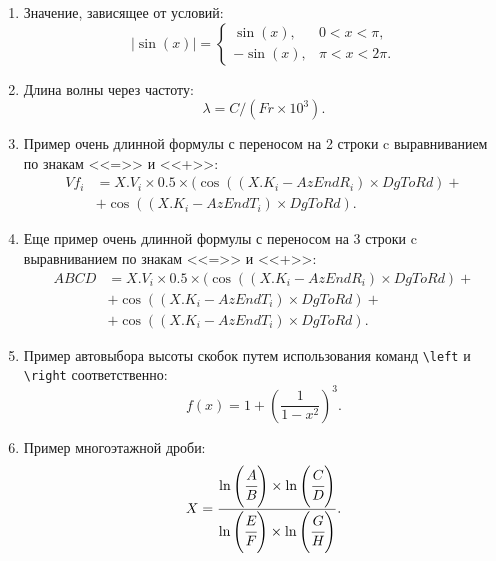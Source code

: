 \begin{enumerate}
\item Значение, зависящее от условий:
{%
	\begin{equation}	
	|\sin(x)|=
	\begin{cases}
	\sin(x), & 0<x<\pi, \\
	-\sin(x), & \pi<x<2\pi.	
	\end{cases}
	\label{eq:ф13}
	\end{equation}
}
\item Длина волны через частоту:
{\zerodisplayskips
	\begin{equation}	
	\lambda=C/(Fr \times 10^3).
	\end{equation}
}
\item Пример очень длинной формулы с переносом на 2 строки c выравниванием по знакам <<=>> и <<+>>:
{%
	\begin{equation}
	\begin{split}	
	Vf_i&=X.V_i\times 0.5 \times (\cos((X.K_i - AzEndR_i)\times DgToRd) +{}\\
	    &+\cos((X.K_i - AzEndT_i)\times DgToRd).
	\label{eq:ф14}
	\end{split}
	\end{equation}
}
\item Еще пример очень длинной формулы с переносом на 3 строки c выравниванием по знакам <<=>> и <<+>>:
{%
	\begin{equation}
	\begin{split}	
	ABCD&=X.V_i\times 0.5 \times (\cos((X.K_i - AzEndR_i)\times DgToRd) +{}\\
	&+\cos((X.K_i - AzEndT_i)\times DgToRd)+{}\\
	&+\cos((X.K_i - AzEndT_i)\times DgToRd).  
	\label{eq:ф15}
	\end{split}
	\end{equation}
}
\item Пример автовыбора высоты скобок путем использования команд \verb=\left= и \verb=\right= соответственно:
{
	\begin{equation}
	f(x)=1+\left(\frac{1}{1-x^{2}}
	\right)^3.
	\end{equation}
}
\item Пример многоэтажной дроби:
{%
	\begin{equation}
	X=\frac{\ln\left(\cfrac{A}{B}\right)\times \ln\left(\cfrac{C}{D}\right)}{\ln\left(\cfrac{E}{F} \right)\times \ln\left(\cfrac{G}{H} \right)}.
	\end{equation}
}
\end{enumerate}	


